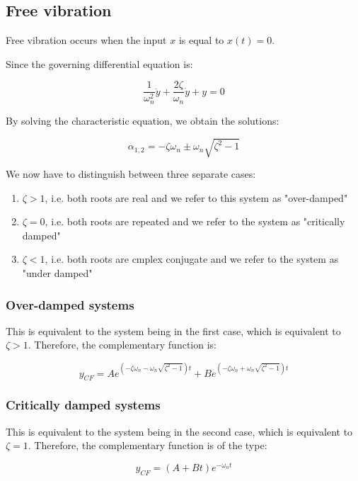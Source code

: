 \documentclass[12pt]{article}
\begin{document}
\subsection{Free vibration}

\begin{definition}
  Free vibration occurs when the input $x$ is equal to $x(t) = 0$.
\end{definition}

Since the governing differential equation is:

\[ \frac{1}{\omega_n^2}\ddot{y} + \frac{2\zeta}{\omega_n}\dot{y} + y = 0 \]

By solving the characteristic equation, we obtain the solutions:

\[ \alpha_{1, 2} = -\zeta\omega_n \pm \omega_n\sqrt{\zeta^2 - 1} \]

We now have to distinguish between three separate cases:

\begin{enumerate}
  \item $\zeta > 1$, i.e. both roots are real and we refer to this system as "over-damped"
  \item $\zeta = 0$, i.e. both roots are repeated and we refer to the system as "critically damped"
  \item $\zeta < 1$, i.e. both roots are cmplex conjugate and we refer to the system as "under damped"
\end{enumerate}

\subsubsection{Over-damped systems}

This is equivalent to the system being in the first case, which is equivalent to $\zeta > 1$. Therefore, the complementary function is:

\[ y_{CF} = Ae^{\left(-\zeta\omega_n - \omega_n\sqrt{\zeta^2 - 1}\right)t} + Be^{\left(-\zeta\omega_n + \omega_n\sqrt{\zeta^2 - 1}\right)t} \]

\subsubsection{Critically damped systems}

This is equivalent to the system being in the second case, which is equivalent to $\zeta = 1$. Therefore, the complementary function is of the type:

\[ y_{CF} = (A + Bt)e^{-\omega_n t} \]
\end{document}
